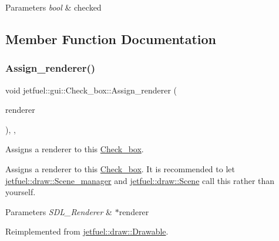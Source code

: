 \begin{DoxyParams}{Parameters}
{\em bool} & checked \\
\hline
\end{DoxyParams}


\subsection{Member Function Documentation}
\mbox{\label{classjetfuel_1_1gui_1_1Check__box_a544261fc2f2d182b73c7ea629fa35e78}} 
\subsubsection{\texorpdfstring{Assign\+\_\+renderer()}{Assign\_renderer()}}
{\footnotesize\ttfamily void jetfuel\+::gui\+::\+Check\+\_\+box\+::\+Assign\+\_\+renderer (\begin{DoxyParamCaption}\item[{S\+D\+L\+\_\+\+Renderer $\ast$}]{renderer }\end{DoxyParamCaption})\hspace{0.3cm}{\ttfamily [inline]}, {\ttfamily [override]}, {\ttfamily [virtual]}}



Assigns a renderer to this \hyperlink{classjetfuel_1_1gui_1_1Check__box}{Check\+\_\+box}. 

Assigns a renderer to this \hyperlink{classjetfuel_1_1gui_1_1Check__box}{Check\+\_\+box}. It is recommended to let \hyperlink{classjetfuel_1_1draw_1_1Scene__manager}{jetfuel\+::draw\+::\+Scene\+\_\+manager} and \hyperlink{classjetfuel_1_1draw_1_1Scene}{jetfuel\+::draw\+::\+Scene} call this rather than yourself.


\begin{DoxyParams}{Parameters}
{\em S\+D\+L\+\_\+\+Renderer} & $\ast$renderer \\
\hline
\end{DoxyParams}


Reimplemented from \hyperlink{classjetfuel_1_1draw_1_1Drawable_a0d7257f197d6ffcdd89c3a99c93d1400}{jetfuel\+::draw\+::\+Drawable}.

\mbox{\label{classjetfuel_1_1gui_1_1Check__box_a0e50420591dbd64f07f02f9ee7cec637}} 
